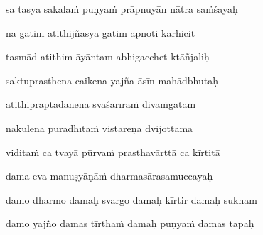 sa tasya sakala\.m puṇya\.m prāpnuyān nātra sa\.mśayaḥ\thinspace{\dandab} \dontdisplaylinenum

na gatim atithijñasya gatim āpnoti karhicit \veg\dontdisplaylinenum

tasmād atithim āyāntam abhigacchet ktāñjaliḥ\thinspace{\dandab} \dontdisplaylinenum

saktuprasthena caikena yajña āsīn mahādbhutaḥ \veg\dontdisplaylinenum

atithiprāptadānena svaśarīra\.m diva\.mgatam\thinspace{\dandab} \dontdisplaylinenum

nakulena purādhīta\.m vistareṇa dvijottama \danda\dontdisplaylinenum

vidita\.m ca tvayā pūrva\.m prasthavārttā ca kīrtitā \veg\dontdisplaylinenum


dama eva manuṣyāṇā\.m dharmasārasamuccayaḥ\thinspace{\dandab} \dontdisplaylinenum

damo dharmo damaḥ svargo damaḥ kīrtir damaḥ sukham \veg\dontdisplaylinenum

damo yajño damas tīrtha\.m damaḥ puṇya\.m damas tapaḥ\thinspace{\dandab} \dontdisplaylinenum


